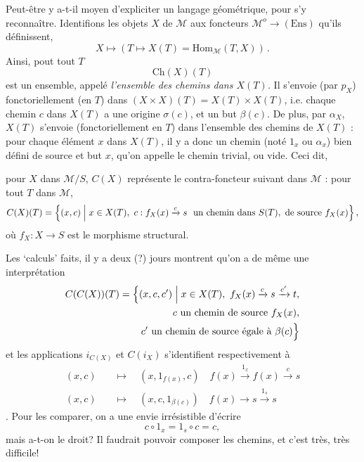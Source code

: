 \documentclass[11pt]{article}
\newcommand{\printedpage}[1]{\marginpar{\footnotesize p.~#1}}
\newcommand{\msp}[1]{\marginpar{\footnotesize [#1]}}
\newcommand{\Ch}{\mathrm{Ch}}
\begin{document}
Peut-être y a-t-il moyen d'expliciter un langage géométrique, pour s'y reconnaître. Identifions les objets $X$ de $\mathcal{M}$ aux foncteurs $\mathcal{M}^o\longrightarrow(\mathrm{Ens})$ qu'ils définissent,
\[
X\longmapsto(T\longmapsto X(T)=\mathrm{Hom}_{\mathcal{M}}(T,X))\,.
\]
Ainsi, pout tout $T$ %
\[
\Ch(X)(T)
\]
est un ensemble, appelé \textit{l'ensemble des chemins dans $X(T)$.} Il s'envoie (par $p_X$) fonctoriellement (en $T$) dans $(X\times X)(T)=X(T)\times X(T)$, i.e. chaque chemin $c$ dans $X(T)$ a une origine $\sigma(c)$, et un but $\beta(c)$. De plus, par $\alpha_X$, $X(T)$ s'envoie (fonctoriellement en $T$) dans l'ensemble des chemins de $X(T)$ : pour chaque élément $x$ dans $X(T)$, il y a donc un chemin (noté $1_x$ ou $\alpha_x$) bien défini de source et but $x$, qu'on appelle le chemin trivial, ou vide. Ceci dit,


\printedpage{66}

\msp{page 105}
pour $X$ dans $\mathcal{M}/S$, $C(X)$ représente le contra-foncteur suivant dans $\mathcal{M}$ : pour tout $T$ dans $\mathcal{M}$,
\[
C(X)(T)=\Bigl\{(x,c)\Bigm| x\in X(T),\ c : f_X(x)\xrightarrow{c}s\ \text{ un chemin dans } S(T), \text{ de source } f_X(x)\Bigr\}\,,
\]
où $f_X : X\longrightarrow S$ est le morphisme structural.

Les ‘calculs’ faits, il y a deux (?) jours montrent qu'on a de même une interprétation
\[
\begin{aligned}
C(C(X))(T)=\Bigl\{(x,c,c')\Bigm| x\in X(T),\ f_X(x)\xrightarrow{c}s\xrightarrow{c'}t,\\
c\text{ un chemin de source } f_X(x),\\
c'\text{ un chemin de source égale à } \beta(c)\Bigr\}
\end{aligned}
\]
et les applications $i_{C(X)}$ et $C(i_X)$ s'identifient respectivement à
\[
\begin{aligned}
(x,c)\quad&\longmapsto\quad(x,1_{f(x)},c)\quad f(x)\xrightarrow{1_x}f(x)\xrightarrow{c}s\\
(x,c)\quad&\longmapsto\quad(x,c,1_{\beta(c)})\quad f(x)\longrightarrow s\xrightarrow{1_s}s
\end{aligned}
\]
. Pour les comparer, on a une envie irrésistible d'écrire
\[
c\circ 1_x=1_s\circ c=c,
\]
mais a-t-on le droit? Il faudrait pouvoir composer les chemins, et c'est très, très difficile!
\end{document}
